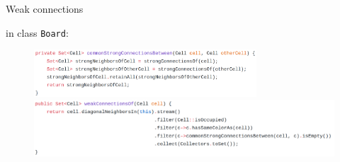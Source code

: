 \documentclass{beamer}
\begin{document}
\begin{frame}{Weak connections}

	in class \texttt{Board}:
\begin{figure}
	\raggedright
	\includegraphics[width=0.74\textwidth]{images/board2.png}
	\raggedright
	\includegraphics[width=1\textwidth]{images/board3.png}
\end{figure}

\end{frame}
\end{document}
